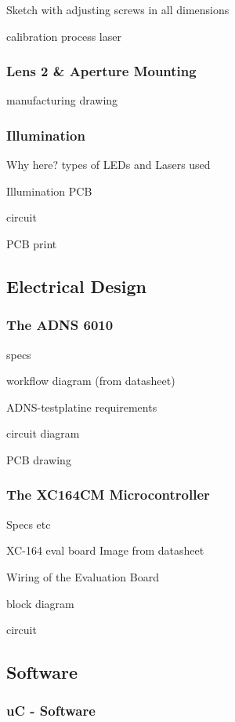 \documentclass[12pt,a4paper]{article}
\begin{document}
Sketch with adjusting screws in all dimensions

calibration process
  laser

\subsubsection{Lens 2 \& Aperture Mounting}

manufacturing drawing

\subsubsection{Illumination}

  Why here?
  types of LEDs and Lasers used
 
  Illumination PCB

  circuit

  PCB print


\subsection{Electrical Design}

\subsubsection{The ADNS 6010}

specs

workflow diagram (from datasheet)

ADNS-testplatine
  requirements

  circuit diagram

  PCB drawing

\subsubsection{The XC164CM Microcontroller}

Specs etc

XC-164 eval board 
  Image from datasheet

Wiring of the Evaluation Board

  block diagram

  circuit

\subsection{Software}

\subsubsection{uC - Software}
\end{document}
